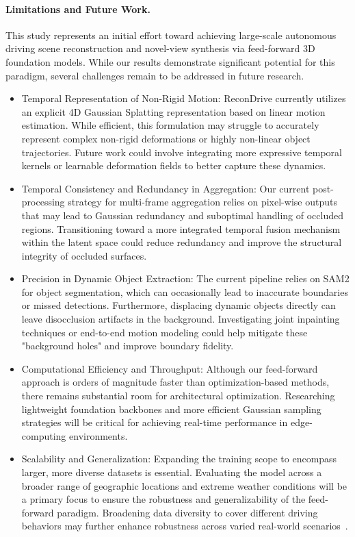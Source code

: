 \paragraph{Limitations and Future Work.} This study represents an initial effort toward achieving large-scale autonomous driving scene reconstruction and novel-view synthesis via feed-forward 3D foundation models. While our results demonstrate significant potential for this paradigm, several challenges remain to be addressed in future research.
\begin{itemize}
    \item Temporal Representation of Non-Rigid Motion: ReconDrive currently utilizes an explicit 4D Gaussian Splatting representation based on linear motion estimation. While efficient, this formulation may struggle to accurately represent complex non-rigid deformations or highly non-linear object trajectories. Future work could involve integrating more expressive temporal kernels or learnable deformation fields to better capture these dynamics.
    \item Temporal Consistency and Redundancy in Aggregation: Our current post-processing strategy for multi-frame aggregation relies on pixel-wise outputs that may lead to Gaussian redundancy and suboptimal handling of occluded regions. Transitioning toward a more integrated temporal fusion mechanism within the latent space could reduce redundancy and improve the structural integrity of occluded surfaces.
    \item Precision in Dynamic Object Extraction: The current pipeline relies on SAM2 for object segmentation, which can occasionally lead to inaccurate boundaries or missed detections. Furthermore, displacing dynamic objects directly can leave disocclusion artifacts in the background. Investigating joint inpainting techniques or end-to-end motion modeling could help mitigate these "background holes" and improve boundary fidelity.
    \item Computational Efficiency and Throughput: Although our feed-forward approach is orders of magnitude faster than optimization-based methods, there remains substantial room for architectural optimization. Researching lightweight foundation backbones and more efficient Gaussian sampling strategies will be critical for achieving real-time performance in edge-computing environments.
    \item Scalability and Generalization: Expanding the training scope to encompass larger, more diverse datasets is essential. Evaluating the model across a broader range of geographic locations and extreme weather conditions will be a primary focus to ensure the robustness and generalizability of the feed-forward paradigm. Broadening data diversity to cover different driving behaviors may further enhance robustness across varied real-world scenarios~\cite{hao2025styledrive}.
\end{itemize}